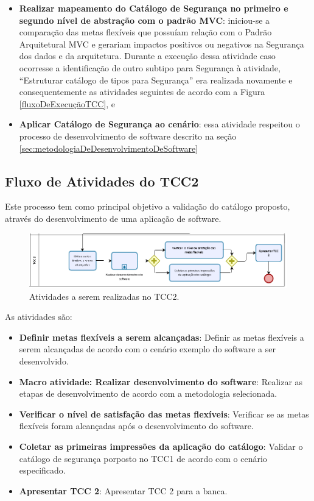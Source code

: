 \begin{itemize}
	\item \textbf{Realizar mapeamento do Catálogo de Segurança no primeiro e segundo nível de abstração com o padrão MVC}: iniciou-se a comparação das metas flexíveis que possuíam relação com o Padrão Arquitetural MVC e gerariam impactos positivos ou negativos na Segurança dos dados e da arquitetura. Durante a execução dessa atividade caso ocorresse a identificação de outro subtipo para Segurança à atividade, “Estruturar catálogo de tipos para Segurança” era realizada novamente e consequentemente as atividades seguintes de acordo com a Figura \ref{fluxoDeExecuçãoTCC}, e
	
	\item \textbf{Aplicar Catálogo de Segurança ao cenário}: essa atividade respeitou o processo de desenvolvimento de software descrito na seção \ref{sec:metodologiaDeDesenvolvimentoDeSoftware}
\end{itemize}

\subsection{Fluxo de Atividades do TCC2}

Este processo tem como principal objetivo a validação do catálogo proposto, através do desenvolvimento de uma aplicação de software. 

\begin{figure}[h!]
	\centering
	\includegraphics[keepaspectratio=true,scale=0.7]{figuras/PDM-TCC2.PNG}
	\caption{Atividades a serem realizadas no TCC2.}
	\label{PDM-TCC2}
\end{figure}

As atividades são:

\begin{itemize}
		
	\item \textbf{Definir metas flexíveis a serem alcançadas}: Definir as metas flexíveis a serem alcançadas de acordo com o cenário exemplo do software a ser desenvolvido.  
	
	\item \textbf{Macro atividade: Realizar desenvolvimento do software}: Realizar as etapas de desenvolvimento de acordo com a metodologia selecionada.
	
	\item \textbf{Verificar o nível de satisfação das metas flexíveis}: Verificar se as metas flexíveis foram alcançadas após o desenvolvimento do software.
	
	\item \textbf{Coletar as primeiras impressões da aplicação do catálogo}: Validar o catálogo de segurança porposto no TCC1 de acordo com o cenário especificado. 
	
	\item \textbf{Apresentar TCC 2}: Apresentar TCC 2 para a banca.
\end{itemize}

